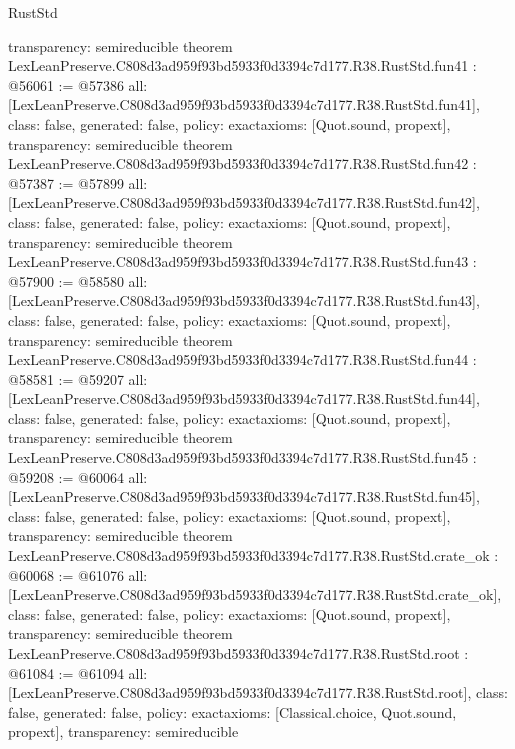 \begin{lexlean}{RustStd}
\begin{coremodule}
{  transparency: semireducible
}
theorem LexLeanPreserve.C808d3ad959f93bd5933f0d3394c7d177.R38.RustStd.fun41 : @56061 := @57386 {
  all: [LexLeanPreserve.C808d3ad959f93bd5933f0d3394c7d177.R38.RustStd.fun41],
  class: false,
  generated: false,
  policy: exact{axioms: [Quot.sound, propext]},
  transparency: semireducible
}
theorem LexLeanPreserve.C808d3ad959f93bd5933f0d3394c7d177.R38.RustStd.fun42 : @57387 := @57899 {
  all: [LexLeanPreserve.C808d3ad959f93bd5933f0d3394c7d177.R38.RustStd.fun42],
  class: false,
  generated: false,
  policy: exact{axioms: [Quot.sound, propext]},
  transparency: semireducible
}
theorem LexLeanPreserve.C808d3ad959f93bd5933f0d3394c7d177.R38.RustStd.fun43 : @57900 := @58580 {
  all: [LexLeanPreserve.C808d3ad959f93bd5933f0d3394c7d177.R38.RustStd.fun43],
  class: false,
  generated: false,
  policy: exact{axioms: [Quot.sound, propext]},
  transparency: semireducible
}
theorem LexLeanPreserve.C808d3ad959f93bd5933f0d3394c7d177.R38.RustStd.fun44 : @58581 := @59207 {
  all: [LexLeanPreserve.C808d3ad959f93bd5933f0d3394c7d177.R38.RustStd.fun44],
  class: false,
  generated: false,
  policy: exact{axioms: [Quot.sound, propext]},
  transparency: semireducible
}
theorem LexLeanPreserve.C808d3ad959f93bd5933f0d3394c7d177.R38.RustStd.fun45 : @59208 := @60064 {
  all: [LexLeanPreserve.C808d3ad959f93bd5933f0d3394c7d177.R38.RustStd.fun45],
  class: false,
  generated: false,
  policy: exact{axioms: [Quot.sound, propext]},
  transparency: semireducible
}
theorem LexLeanPreserve.C808d3ad959f93bd5933f0d3394c7d177.R38.RustStd.crate_ok : @60068 := @61076 {
  all: [LexLeanPreserve.C808d3ad959f93bd5933f0d3394c7d177.R38.RustStd.crate_ok],
  class: false,
  generated: false,
  policy: exact{axioms: [Quot.sound, propext]},
  transparency: semireducible
}
theorem LexLeanPreserve.C808d3ad959f93bd5933f0d3394c7d177.R38.RustStd.root : @61084 := @61094 {
  all: [LexLeanPreserve.C808d3ad959f93bd5933f0d3394c7d177.R38.RustStd.root],
  class: false,
  generated: false,
  policy: exact{axioms: [Classical.choice, Quot.sound, propext]},
  transparency: semireducible
}


\end{coremodule}
\end{lexlean}
